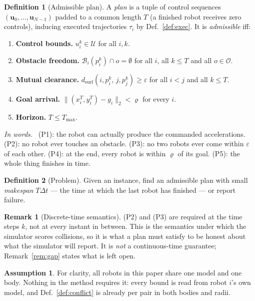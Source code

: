 \documentclass[conference]{IEEEtran}
\theoremstyle{plain}
\theoremstyle{definition}
\newtheorem{definition}{Definition}
\newtheorem{remark}{Remark}
\newtheorem{assumption}{Assumption}
\newcommand{\inwords}{\par\smallskip\noindent\textit{In words.}\ }
\newcommand{\Obs}{\mathcal{O}}
\newcommand{\Bod}{\mathcal{B}}
\newcommand{\Uc}{\mathcal{U}}
\newcommand{\clr}{\varepsilon}
\begin{document}
\begin{definition}[Admissible plan]
\label{def:plan}
A \emph{plan} is a tuple of control sequences $(\mathbf{u}_0,\dots,\mathbf{u}_{N-1})$ padded
to a common length $T$ (a finished robot receives zero controls), inducing executed
trajectories $\tau_i$ by Def.~\ref{def:exec}. It is \emph{admissible} iff:
\begin{enumerate}
  \item[(P1)] \textbf{Control bounds.} $u_i^k \in \Uc$ for all $i,k$.
  \item[(P2)] \textbf{Obstacle freedom.} $\Bod_i(p_i^k) \cap o = \emptyset$ for all
        $i$, all $k \le T$ and all $o \in \Obs$.
  \item[(P3)] \textbf{Mutual clearance.}
        $d_{\text{surf}}(i,p_i^k,\,j,p_j^k) \ge \clr$ for all $i < j$ and all $k \le T$.
  \item[(P4)] \textbf{Goal arrival.}
        $\lVert (x_i^T,y_i^T) - g_i \rVert_2 < \varrho$ for every $i$.
  \item[(P5)] \textbf{Horizon.} $T \le T_{\max}$.
\end{enumerate}
\inwords
(P1): the robot can actually produce the commanded accelerations. (P2): no robot ever touches
an obstacle. (P3): no two robots ever come within $\clr$ of each other. (P4): at the end,
every robot is within $\varrho$ of its goal. (P5): the whole thing finishes in time.
\end{definition}

\begin{definition}[Problem]
\label{def:problem}
Given an instance, find an admissible plan with small \emph{makespan} $T\Delta t$ --- the time
at which the last robot has finished --- or report failure.
\end{definition}

\begin{remark}[Discrete-time semantics]
(P2) and (P3) are required at the time steps $k$, not at every instant in between. This is
the semantics under which the simulator scores collisions, so it is what a plan must satisfy
to be honest about what the simulator will report. It is \emph{not} a continuous-time
guarantee; Remark~\ref{rem:gap} states what is left open.
\end{remark}

\begin{assumption}
\label{ass:homog}
For clarity, all robots in this paper share one model and one body. Nothing in the method
requires it: every bound is read from robot $i$'s own model, and Def.~\ref{def:conflict} is
already per pair in both bodies and radii.
\end{assumption}
\end{document}
